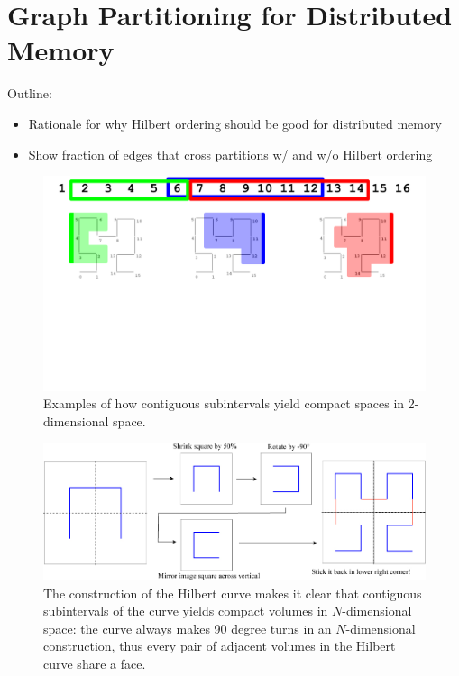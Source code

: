 \section{Graph Partitioning for Distributed Memory}
\label{sec:partitions}


Outline:
\begin{itemize}
\item Rationale for why Hilbert ordering should be good for distributed memory
\item Show fraction of edges that cross partitions w/ and w/o Hilbert ordering
\end{itemize}

\begin{figure}[h]
\centering
\includegraphics[width=5in,clip,trim=0 5cm 0 0]{figures/hilbert_compact.pdf}
\caption{Examples of how contiguous subintervals yield compact
spaces in 2-dimensional space.}
\label{fig:hilbert_compact}
\end{figure}

\begin{figure}[h]
\centering
\includegraphics[width=5in,clip,trim=0 0 0 0]{figures/fourthifs.jpg}
\caption{The construction of the Hilbert curve makes it
clear that contiguous subintervals of the curve yields
compact volumes in $N$-dimensional space: the curve always
makes 90 degree turns in an $N$-dimensional construction,
thus every pair of adjacent volumes in the Hilbert curve share a
face.}
\label{fig:hilbert_construction}
\end{figure}




